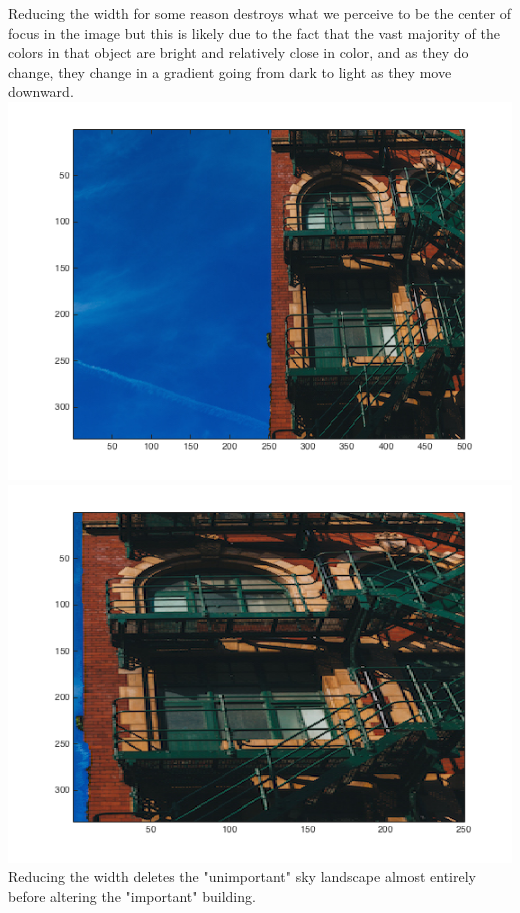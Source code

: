 \documentclass[11pt]{amsart}
\begin{document}
\begin{center}
Reducing the width for some reason destroys what we perceive to be the center of focus in the image but this is likely due to the fact that the vast majority of the colors in that object are bright and relatively close in color, and as they do change, they change in a gradient going from dark to light as they move downward. \\
\includegraphics[scale=0.40]{originalStairs.png}
\includegraphics[scale=0.40]{outputReduceWidthStairs.png}
Reducing the width deletes the "unimportant" sky landscape almost entirely before altering the "important" building. \\

\end{center}
\end{document}
